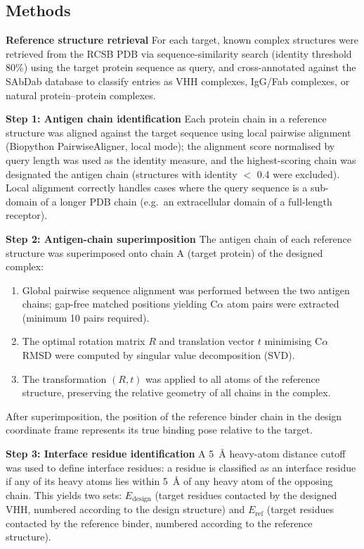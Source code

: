 \documentclass[11pt]{article}
\begin{document}
\subsection{Methods}
\textbf{Reference structure retrieval} For each target, known complex structures were retrieved from the RCSB
PDB via sequence-similarity search (identity threshold 80\%) using the target protein sequence as query, and
cross-annotated against the SAbDab database to classify entries as VHH complexes, IgG/Fab complexes, or
natural protein--protein complexes.

\textbf{Step 1: Antigen chain identification} Each protein chain in a reference structure was aligned against the
target sequence using local pairwise alignment (Biopython PairwiseAligner, local mode); the alignment
score normalised by query length was used as the identity measure, and the highest-scoring chain was
designated the antigen chain (structures with identity $<$ 0.4 were excluded). Local alignment correctly
handles cases where the query sequence is a sub-domain of a longer PDB chain (e.g.\ an extracellular domain
of a full-length receptor).

\textbf{Step 2: Antigen-chain superimposition} The antigen chain of each reference structure was superimposed
onto chain A (target protein) of the designed complex:
\begin{enumerate}
  \item Global pairwise sequence alignment was performed between the two antigen chains; gap-free matched
        positions yielding C$\alpha$ atom pairs were extracted (minimum 10 pairs required).
  \item The optimal rotation matrix $R$ and translation vector $t$ minimising C$\alpha$ RMSD were computed by
        singular value decomposition (SVD).
  \item The transformation $(R, t)$ was applied to all atoms of the reference structure, preserving the relative
        geometry of all chains in the complex.
\end{enumerate}
After superimposition, the position of the reference binder chain in the design coordinate frame represents its
true binding pose relative to the target.

\textbf{Step 3: Interface residue identification} A 5~\AA{} heavy-atom distance cutoff was used to define interface
residues: a residue is classified as an interface residue if any of its heavy atoms lies within 5~\AA{} of any heavy
atom of the opposing chain. This yields two sets: $E_{\mathrm{design}}$ (target residues contacted by the designed VHH,
numbered according to the design structure) and $E_{\mathrm{ref}}$ (target residues contacted by the reference binder,
numbered according to the reference structure).
\end{document}
